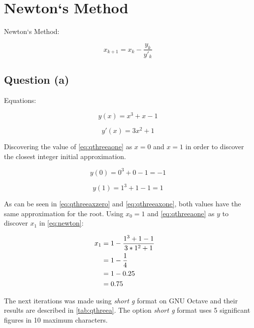 \section{Newton`s Method}

	Newton`s Method:

	\begin{equation}
		x_{k+1} = x_{k} - \frac{y_{k}}{y'_{k}}
	\label{eq:newton}
	\end{equation}

	\subsection{Question (a)}
		
		Equations:

		\begin{equation}
			y(x) = x^3 + x - 1
		\label{eq:qthreeaone}
		\end{equation}

		\begin{equation}
			y'(x) = 3x^2 + 1
		\label{eq:qthreeaoned}
		\end{equation}

		Discovering the value of \cref{eq:qthreeaone} as $x = 0$ and $x = 1$ in order to discover the closest integer initial approximation.

		\begin{equation}
			y(0) = 0^3 + 0 - 1 = -1
		\label{eq:qthreeaxzero}
		\end{equation}

		\begin{equation}
			y(1) = 1^3 + 1 - 1 = 1
		\label{eq:qthreeaxone}
		\end{equation}

		As can be seen in \cref{eq:qthreeaxzero} and \cref{eq:qthreeaxone}, both values have the same approximation for the root. Using $x_{0} = 1$ and \cref{eq:qthreeaone} as $y$ to discover $x_{1}$ in \cref{eq:newton}:
	
		\begin{align}
			x_{1} &= 1 - \frac{1^3 + 1 - 1}{3*1^2 + 1}& \notag \\
			&= 1 - \frac{1}{4}& \notag \\
			&= 1 - 0.25& \notag \\
			&= 0.75&
			\label{eq:qthreeaxones}
		\end{align}

		The next iterations was made using \emph{short g} format on GNU Octave and their results are described in \cref{tab:qthreea}. The option \emph{short g} format uses 5 significant figures in 10 maximum characters.

